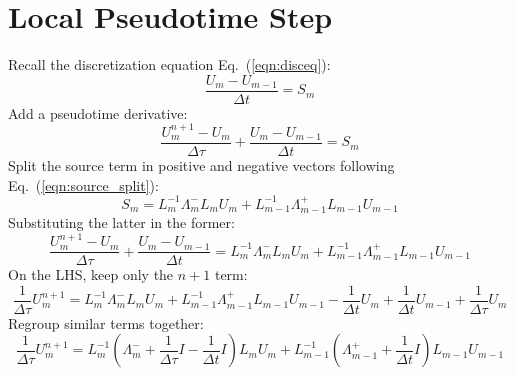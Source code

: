\documentclass{warpdoc}
\begin{document}


\section{Local Pseudotime Step}

Recall the discretization equation Eq.\ (\ref{eqn:disceq}):
%
\begin{equation}
\frac{U_{m}-U_{m-1}}{\Delta t} = S_{m} 
\end{equation}
%
Add a pseudotime derivative:
%
\begin{equation}
\frac{U^{n+1}_m-U_m}{\Delta \tau}
+\frac{U_{m}-U_{m-1}}{\Delta t} = S_{m} 
\end{equation}
%
Split the source term in positive and negative vectors following Eq.\ (\ref{eqn:source_split}):
%
\begin{equation}
  S_{m} = L^{-1}_{m} \Lambda_{m}^- L_{m} U_{m} + L^{-1}_{m-1} \Lambda_{m-1}^+ L_{m-1} U_{m-1}
\end{equation}
%
Substituting the latter in the former:
%
\begin{equation}
\frac{U^{n+1}_m-U_m}{\Delta \tau}
+\frac{U_{m}-U_{m-1}}{\Delta t} = L^{-1}_{m} \Lambda_{m}^- L_{m} U_{m} + L^{-1}_{m-1} \Lambda_{m-1}^+ L_{m-1} U_{m-1}
\end{equation}
%
On  the LHS, keep only the $n+1$ term:
%
\begin{equation}
\frac{1}{\Delta \tau} U^{n+1}_m
 = L^{-1}_{m} \Lambda_{m}^- L_{m} U_{m} + L^{-1}_{m-1} \Lambda_{m-1}^+ L_{m-1} U_{m-1}
-\frac{1}{\Delta t} U_{m}+\frac{1}{\Delta t} U_{m-1}
+\frac{1}{\Delta \tau} U_m
\end{equation}
%
Regroup similar terms together:
%
\begin{equation}
\frac{1}{\Delta \tau} U^{n+1}_m
 = L^{-1}_{m} \left( \Lambda_{m}^- + \frac{1}{\Delta \tau}I -\frac{1}{\Delta t}I\right) L_{m} U_{m} 
 + L^{-1}_{m-1} \left( \Lambda_{m-1}^+ + \frac{1}{\Delta t}I \right) L_{m-1} U_{m-1}
\end{equation}
%
 




\end{document}
